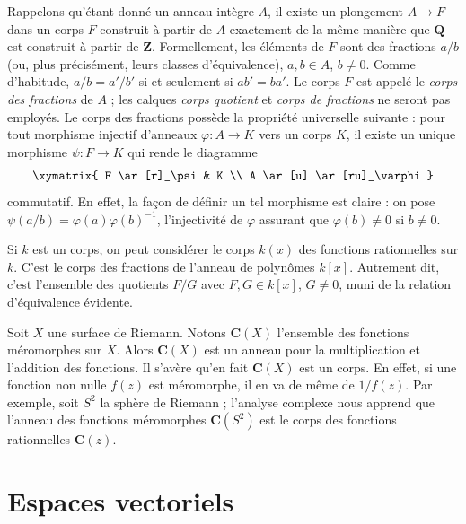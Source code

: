 \begin{example}
\label{example-quotient-field}
Rappelons qu'étant donné un anneau intègre $A$, il existe un plongement $A \to F$ dans un
corps $F$ construit à partir de $A$ exactement de la même manière que
$\mathbf{Q}$ est construit à partir de $\mathbf{Z}$. Formellement, les éléments
de $F$ sont des fractions $a/b$ (ou, plus précisément, leurs classes d'équivalence),
$a, b \in A$, $b \not = 0$. Comme d'habitude, $a/b = a'/b'$ si et seulement si $ab' = ba'$.
Le corps $F$ est appelé le {\it corps des fractions} de $A$ ; les calques
{\it corps quotient} et {\it corps de fractions} ne seront pas employés.
Le corps des fractions possède la propriété universelle suivante : pour tout
morphisme injectif d'anneaux $\varphi : A \to K$ vers un corps $K$, il existe un unique
morphisme $\psi : F \to K$ qui rende le diagramme
$$
\xymatrix{
F \ar[r]_\psi & K \\
A \ar[u] \ar[ru]_\varphi
}
$$
commutatif. En effet, la façon de définir un tel morphisme est claire : on pose
$\psi(a/b) = \varphi(a)\varphi(b)^{-1}$, l'injectivité de $\varphi$
assurant que $\varphi(b) \not = 0$ si $ b \not = 0$.
\end{example}

\begin{example}
\label{example-field-of-rational-functions}
Si $k$ est un corps, on peut considérer le corps $k(x)$ des fonctions
rationnelles sur $k$. C'est le corps des fractions de l'anneau de polynômes
$k[x]$. Autrement dit, c'est l'ensemble des quotients $F/G$ avec
$F, G \in k[x]$, $G \not = 0$, muni de la relation d'équivalence évidente.
\end{example}

\begin{example}
\label{example-field-of-meromorphic-functions}
Soit $X$ une surface de Riemann. Notons $\mathbf{C}(X)$
l'ensemble des fonctions méromorphes sur $X$. Alors $\mathbf{C}(X)$ est un anneau pour
la multiplication et l'addition des fonctions. Il s'avère qu'en fait
$\mathbf{C}(X)$ est un corps. En effet, si une fonction non nulle $f(z)$ est
méromorphe, il en va de même de $1/f(z)$. Par exemple, soit $S^2$ la sphère
de Riemann ; l'analyse complexe nous apprend que l'anneau des fonctions méromorphes
$\mathbf{C}(S^2)$ est le corps des fonctions rationnelles $\mathbf{C}(z)$.
\end{example}



\section{Espaces vectoriels}
\label{section-vector-spaces}

